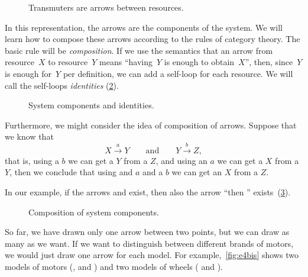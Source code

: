 
\begin{figure}[h!]
    \centering
    \caption{Transmuters are arrows between resources. \label{fig:e2}}
\end{figure}

In this representation, the arrows are the components of the system.
We will learn how to compose these arrows according to the rules of category theory.
The basic rule will be \emph{composition}.
If we use the semantics that an arrow from resource~$X$ to resource~$Y$ means ``having~$Y$ is
enough to obtain~$X$'', then, since~$Y$ is enough for~$Y$ per definition, we can add a self-loop for each
resource. We will call the self-loops \emph{identities} (\cref{fig:e3}).

\begin{figure}[h!]
    \centering
    \caption{System components and identities. \label{fig:e3}}
\end{figure}

Furthermore, we might consider the idea of composition of arrows. 
Suppose that we know that 
$$
    X \stackrel{a}{\longrightarrow} Y\qquad \text{and} \qquad Y \stackrel{b}{\longrightarrow} Z,
$$
that is, using a $b$ we can get a $Y$ from a $Z$, and using an $a$ we can get a $X$ from a $Y$,
then we conclude that using and $a$ and a $b$ we can get an $X$ from a $Z$. 

In our example, if the arrows \wheels  and \motor exist, then also the arrow ``\wheels then \motor'' exists~(\cref{fig:e4}).

\begin{figure}[h!]
    \centering
    
    \caption{Composition of system components. \label{fig:e4}}
\end{figure}

So far, we have drawn only one arrow between two points, but we can draw as many as we want. 
If we want to distinguish between different brands of motors, we would just draw 
one arrow for each model. For example,~\cref{fig:e4bis} shows two models of
motors (, and ) and two models of wheels 
( and ).

